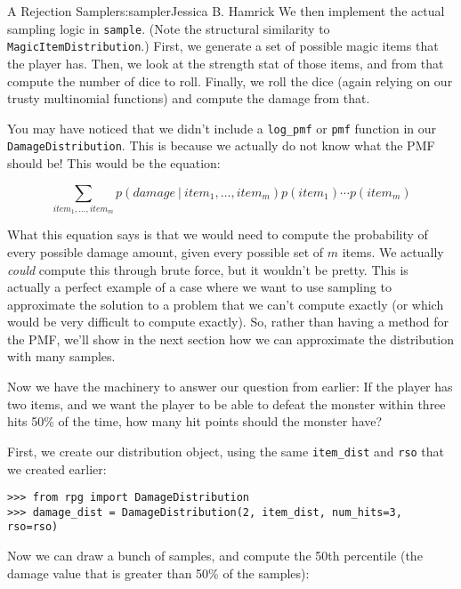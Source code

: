 \begin{aosachapter}{A Rejection Sampler}{s:sampler}{Jessica B. Hamrick}
We then implement the actual sampling logic in \texttt{sample}. (Note
the structural similarity to \texttt{MagicItemDistribution}.) First, we
generate a set of possible magic items that the player has. Then, we
look at the strength stat of those items, and from that compute the
number of dice to roll. Finally, we roll the dice (again relying on our
trusty multinomial functions) and compute the damage from that.

\label{what-happened-to-evaluating-probabilities}

You may have noticed that we didn't include a \texttt{log\_pmf} or
\texttt{pmf} function in our \texttt{DamageDistribution}. This is
because we actually do not know what the PMF should be! This would be
the equation:

\[
\sum_{{item}_1, \ldots{}, {item}_m}p({damage}\ |\ {item}_1,\ldots{},{item}_m)p({item}_1)\cdots{}p({item}_m)
\]

What this equation says is that we would need to compute the probability
of every possible damage amount, given every possible set of $m$ items.
We actually \emph{could} compute this through brute force, but it
wouldn't be pretty. This is actually a perfect example of a case where
we want to use sampling to approximate the solution to a problem that we
can't compute exactly (or which would be very difficult to compute
exactly). So, rather than having a method for the PMF, we'll show in the
next section how we can approximate the distribution with many samples.

\label{approximating-the-distribution}

Now we have the machinery to answer our question from earlier: If the
player has two items, and we want the player to be able to defeat the
monster within three hits 50\% of the time, how many hit points should
the monster have?

First, we create our distribution object, using the same
\texttt{item\_dist} and \texttt{rso} that we created earlier:

\begin{verbatim}
>>> from rpg import DamageDistribution
>>> damage_dist = DamageDistribution(2, item_dist, num_hits=3, rso=rso)
\end{verbatim}

Now we can draw a bunch of samples, and compute the 50th percentile (the
damage value that is greater than 50\% of the samples):


\end{aosachapter}
